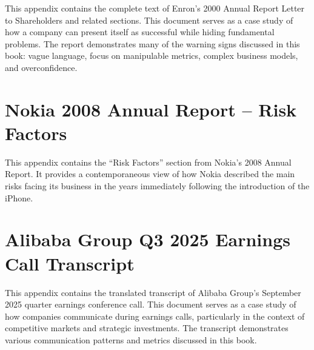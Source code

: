 This appendix contains the complete text of Enron's 2000 Annual Report Letter to Shareholders and related sections. This document serves as a case study of how a company can present itself as successful while hiding fundamental problems. The report demonstrates many of the warning signs discussed in this book: vague language, focus on manipulable metrics, complex business models, and overconfidence.



\chapter{Nokia 2008 Annual Report -- Risk Factors} \label{appendix:nokia_2008_risk_factors}

This appendix contains the ``Risk Factors'' section from Nokia's 2008 Annual Report. It provides a contemporaneous view of how Nokia described the main risks facing its business in the years immediately following the introduction of the iPhone.



\chapter{Alibaba Group Q3 2025 Earnings Call Transcript} \label{appendix:alibaba_2025_q3_earnings_call}

This appendix contains the translated transcript of Alibaba Group's September 2025 quarter earnings conference call. This document serves as a case study of how companies communicate during earnings calls, particularly in the context of competitive markets and strategic investments. The transcript demonstrates various communication patterns and metrics discussed in this book.



\def\IndexPageOffset{1}


